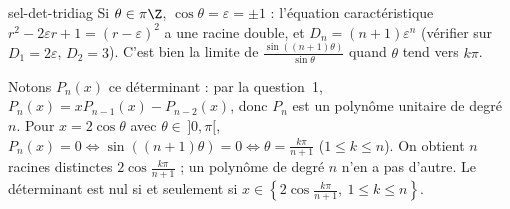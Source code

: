 \begin{corrige}{sel-det-tridiag}
 Si $\theta\in\pi\Z$, $\cos\theta=\varepsilon=\pm1$ : l'équation caractéristique $r^2-2\varepsilon r+1=(r-\varepsilon)^2$ a une racine double, et $D_n=(n+1)\varepsilon^n$ (vérifier sur $D_1=2\varepsilon$, $D_2=3$). C'est bien la limite de $\frac{\sin((n+1)\theta)}{\sin\theta}$ quand $\theta$ tend vers $k\pi$.

 Notons $P_n(x)$ ce déterminant : par la question~1, $P_n(x)=xP_{n-1}(x)-P_{n-2}(x)$, donc $P_n$ est un polynôme unitaire de degré $n$. Pour $x=2\cos\theta$ avec $\theta\in\,]0,\pi[$, $P_n(x)=0\iff\sin((n+1)\theta)=0\iff\theta=\frac{k\pi}{n+1}$ ($1\leq k\leq n$). On obtient $n$ racines distinctes $2\cos\frac{k\pi}{n+1}$ ; un polynôme de degré $n$ n'en a pas d'autre. Le déterminant est nul si et seulement si $x\in\left\{2\cos\frac{k\pi}{n+1},\ 1\leq k\leq n\right\}$.
\end{corrige}

